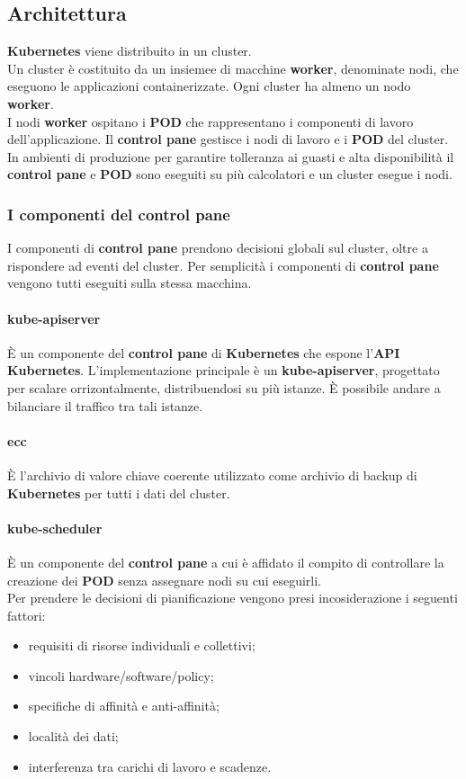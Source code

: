 \documentclass{article}
\begin{document}
\subsection{Architettura}
\textbf{Kubernetes} viene distribuito in un cluster. \\
Un cluster è costituito da un insiemee di macchine \textbf{worker}, denominate nodi, che eseguono le applicazioni containerizzate. Ogni cluster ha almeno un nodo \textbf{worker}.\\
I nodi \textbf{worker} ospitano i \textbf{POD} che rappresentano i componenti di lavoro dell'applicazione. Il \textbf{control pane} gestisce i nodi di lavoro e i \textbf{POD} del cluster. In ambienti di produzione per garantire tolleranza ai guasti e alta disponibilità il \textbf{control pane} e \textbf{POD} sono eseguiti su più calcolatori e un cluster esegue i nodi. 
\subsubsection{I componenti del control pane}
I componenti di \textbf{control pane} prendono decisioni globali sul cluster, oltre a rispondere ad eventi del cluster. Per semplicità i componenti di \textbf{control pane} vengono tutti eseguiti sulla stessa macchina.
\paragraph{kube-apiserver}
È un componente del \textbf{control pane} di  \textbf{Kubernetes} che espone l'\textbf{API Kubernetes}. L'implementazione principale è un \textbf{kube-apiserver}, progettato per scalare orrizontalmente, distribuendosi su più istanze. È possibile andare a bilanciare il traffico tra tali istanze. 
\paragraph{ecc}
È l'archivio di valore chiave coerente utilizzato come archivio di backup di \textbf{Kubernetes} per tutti i dati del cluster.
\paragraph{kube-scheduler}
È un componente del \textbf{control pane} a cui è affidato il compito di controllare la creazione dei \textbf{POD} senza assegnare nodi su cui eseguirli.\\
Per prendere le decisioni di pianificazione vengono presi incosiderazione i seguenti fattori: 
\begin{itemize}
    \item requisiti di risorse individuali e collettivi;
    \item  vincoli hardware/software/policy;
    \item specifiche di affinità e anti-affinità;
    \item località dei dati;
    \item  interferenza tra carichi di lavoro e scadenze.
\end{itemize}
\end{document}
